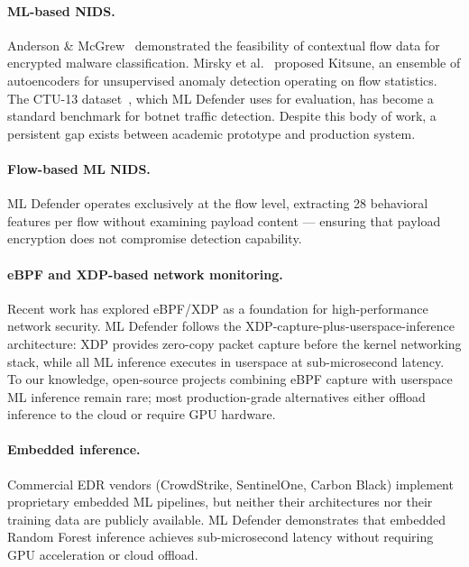 \documentclass[11pt,a4paper]{article}
\begin{document}
    \paragraph{ML-based NIDS.}
    Anderson \& McGrew~\cite{anderson2016} demonstrated the feasibility of contextual flow data
    for encrypted malware classification. Mirsky et al.~\cite{mirsky2018} proposed Kitsune, an
    ensemble of autoencoders for unsupervised anomaly detection operating on flow statistics. The
    CTU-13 dataset~\cite{garcia2014}, which ML Defender uses for evaluation, has become a
    standard benchmark for botnet traffic detection. Despite this body of work, a persistent gap
    exists between academic prototype and production system.

    \paragraph{Flow-based ML NIDS.}
    ML Defender operates exclusively at the flow level, extracting 28 behavioral features per
    flow without examining payload content --- ensuring that payload encryption does not
    compromise detection capability.

    \paragraph{eBPF and XDP-based network monitoring.}
    Recent work has explored eBPF/XDP as a foundation for high-performance network security.
    ML Defender follows the XDP-capture-plus-userspace-inference architecture: XDP provides
    zero-copy packet capture before the kernel networking stack, while all ML inference executes
    in userspace at sub-microsecond latency. To our knowledge, open-source projects combining
    eBPF capture with userspace ML inference remain rare; most production-grade alternatives
    either offload inference to the cloud or require GPU hardware.

    \paragraph{Embedded inference.}
    Commercial EDR vendors (CrowdStrike, SentinelOne, Carbon Black) implement proprietary
    embedded ML pipelines, but neither their architectures nor their training data are publicly
    available. ML Defender demonstrates that embedded Random Forest inference achieves
    sub-microsecond latency without requiring GPU acceleration or cloud offload.
\end{document}
